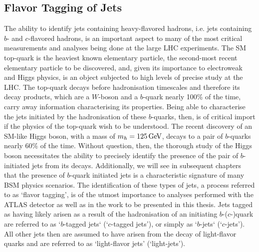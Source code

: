 \subsection{Flavor Tagging of Jets}
\label{sec:flavor_tagging}

The ability to identify jets containing heavy-flavored hadrons, i.e. jets containing
$b$- and $c$-flavored hadrons, is an important aspect to many of the most critical measurements
and analyses being done at the large LHC experiments.
The SM top-quark is the heaviest known elementary particle, the second-most recent elementary particle to be discovered,
and, given its importance to electroweak and Higgs physics, is an object subjected to high levels
of precise study at the LHC.
The top-quark decays before hadronisation timescales and therefore its decay products, which
are a $W$-boson and a $b$-quark nearly 100\% of the time, carry away information characterising its properties.
Being able to characterise the jets initiated by the hadronisation of these $b$-quarks, then,
is of critical import if the physics of the top-quark wish to be understood.
The recent discovery of an SM-like Higgs boson, with a mass of $m_h = 125\,\text{Ge\kern -0.1em V}$, decays
to a pair of $b$-quarks nearly 60\% of the time.
Without question, then, the thorough study of the Higgs boson necessitates the ability to precisely identify
the presence of the pair of $b$-initiated jets from its decays.
Additionally, we will see in subsequent chapters that the presence of $b$-quark initiated jets is
a characteristic signature of many BSM physics scenarios.
The identification of these types of jets, a process referred to as `flavor tagging', is of the utmost importance
to analyses performed with the ATLAS detector as well as in the work to be presented in this thesis.
Jets tagged as having likely arisen as a result of the hadronisation of an initiating $b$-($c$-)quark
are referred to as `$b$-tagged jets` (`$c$-tagged jets'), or simply as `$b$-jets` (`$c$-jets').
All other jets then are assumed to have arisen from the decay of light-flavor quarks and are referred to as `light-flavor jets' (`light-jets').


